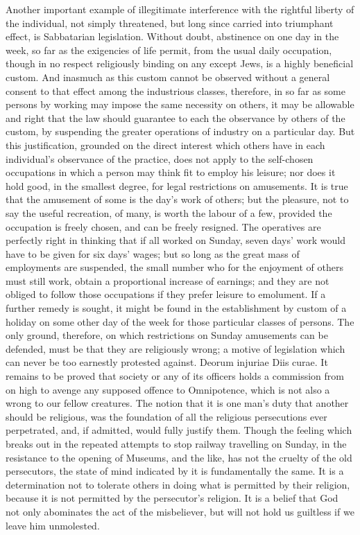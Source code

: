 \documentclass[11pt,openany]{book}
\begin{document}
Another important example of illegitimate interference with the rightful liberty of the individual, not simply threatened, but long since carried into triumphant effect, is Sabbatarian legislation. Without doubt, abstinence on one day in the week, so far as the exigencies of life permit, from the usual daily occupation, though in no respect religiously binding on any except Jews, is a highly beneficial custom. And inasmuch as this custom cannot be observed without a general consent to that effect among the industrious classes, therefore, in so far as some persons by working may impose the same necessity on others, it may be allowable and right that the law should guarantee to each the observance by others of the custom, by suspending the greater operations of industry on a particular day. But this justification, grounded on the direct interest which others have in each individual's observance of the practice, does not apply to the self-chosen occupations in which a person may think fit to employ his leisure; nor does it hold good, in the smallest degree, for legal restrictions on amusements. It is true that the amusement of some is the day's work of others; but the pleasure, not to say the useful recreation, of many, is worth the labour of a few, provided the occupation is freely chosen, and can be freely resigned. The operatives are perfectly right in thinking that if all worked on Sunday, seven days' work would have to be given for six days' wages; but so long as the great mass of employments are suspended, the small number who for the enjoyment of others must still work, obtain a proportional increase of earnings; and they are not obliged to follow those occupations if they prefer leisure to emolument. If a further remedy is sought, it might be found in the establishment by custom of a holiday on some other day of the week for those particular classes of persons. The only ground, therefore, on which restrictions on Sunday amusements can be defended, must be that they are religiously wrong; a motive of legislation which can never be too earnestly protested against. Deorum injuriae Diis curae. It remains to be proved that society or any of its officers holds a commission from on high to avenge any supposed offence to Omnipotence, which is not also a wrong to our fellow creatures. The notion that it is one man's duty that another should be religious, was the foundation of all the religious persecutions ever perpetrated, and, if admitted, would fully justify them. Though the feeling which breaks out in the repeated attempts to stop railway travelling on Sunday, in the resistance to the opening of Museums, and the like, has not the cruelty of the old persecutors, the state of mind indicated by it is fundamentally the same. It is a determination not to tolerate others in doing what is permitted by their religion, because it is not permitted by the persecutor's religion. It is a belief that God not only abominates the act of the misbeliever, but will not hold us guiltless if we leave him unmolested.
\end{document}
